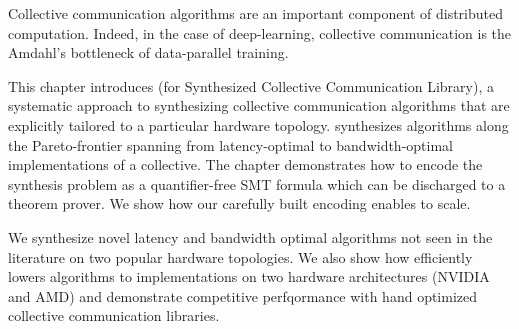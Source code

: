 Collective communication algorithms are an important component of
distributed computation.  Indeed, in the case of deep-learning,
collective communication is the Amdahl's bottleneck of data-parallel
training.

This chapter introduces \tool{} (for Synthesized Collective
Communication Library), a systematic approach to synthesizing collective
communication algorithms that are explicitly tailored to a particular
hardware topology.  \tool{} synthesizes algorithms along the
Pareto-frontier spanning from latency-optimal to bandwidth-optimal
implementations of a collective.  The chapter demonstrates how to encode
the synthesis problem as a quantifier-free SMT formula which can be
discharged to a theorem prover. We show how our carefully built encoding enables
\tool{} to scale.

We synthesize novel latency and bandwidth optimal
algorithms not seen in the literature on two popular hardware
topologies. We also show how \tool{} efficiently lowers algorithms to
implementations on two hardware architectures (NVIDIA and AMD) and
demonstrate competitive perfqormance with hand optimized collective
communication libraries.
